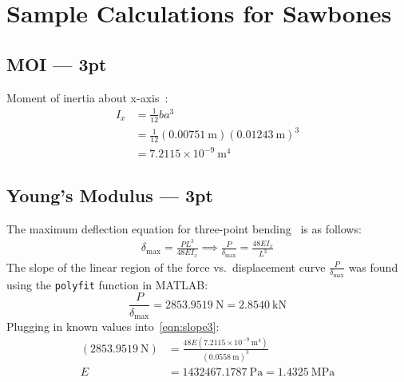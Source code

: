 \documentclass[conference, letterpaper]{IEEEtran}
\begin{document}
\appendices{}
    \section{Sample Calculations for Sawbones}\label{apdx_a}
        \subsection{MOI --- 3pt}\label{apdx_aa}
            Moment of inertia about x-axis~\cite{Hibbeler2022}:
            \begin{align*}
                I_x
                &= \frac{1}{12}ba^3 \\
                &= \frac{1}{12}\left(0.00751\ \text{m}\right){\left(0.01243\ \text{m}\right)}^3 \\
                &= 7.2115\times10^{-9}\ \text{m}^4
            \end{align*}

        \subsection{Young's Modulus --- 3pt}\label{apdx_ab}
            The maximum deflection equation for three-point bending~\cite{3LM2023} is as follows:
            \begin{align}\label{eqn:slope3}
                \delta_{\max}
                = \frac{PL^3}{48E{I_x}}
                \implies 
                \frac{P}{\delta_{\max}}
                = \frac{48E{I_x}}{L^3}
            \end{align}
            The slope of the linear region of the force vs.\ displacement curve \(\frac{P}{\delta_{\max}}\) was found using the \texttt{polyfit} function in MATLAB:\@
            \[
                \frac{P}{\delta_{\max}} 
                = 2853.9519\ \text{N}
                = 2.8540\ \text{kN}
            \]
            Plugging in known values into~\eqref{eqn:slope3}:
            \begin{align*}
                (2853.9519\ \text{N})
                &= \frac{48E(7.2115\times10^{-9}\ \text{m}^4)}{{(0.0558\ \text{m})}^3}\\
                E 
                &= 1432467.1787\ \text{Pa}
                = 1.4325\ \text{MPa}
            \end{align*}
\end{document}
